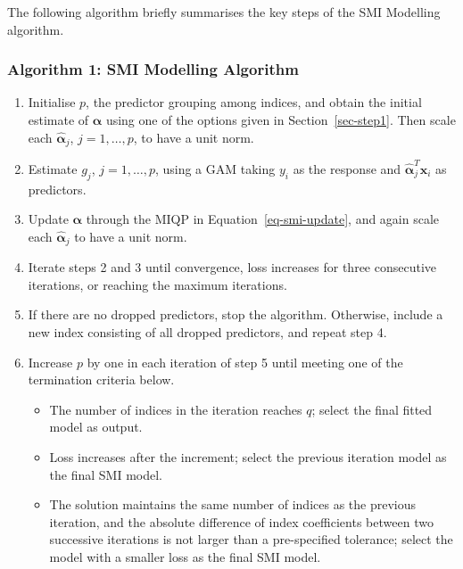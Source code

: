\documentclass[
  11pt,
  a4paper,
]{report}
\providecommand{\tightlist}{%
  \setlength{\itemsep}{0pt}\setlength{\parskip}{0pt}}\usepackage{longtable,booktabs,array}
\begin{document}
The following algorithm briefly summarises the key steps of the SMI
Modelling algorithm. \newline

\subsubsection*{Algorithm 1: SMI Modelling
Algorithm}\label{algorithm-1-smi-modelling-algorithm}

\begin{enumerate}
\def\labelenumi{\arabic{enumi}.}
\tightlist
\item
  Initialise \(p\), the predictor grouping among indices, and obtain the
  initial estimate of \(\bm{\alpha}\) using one of the options given in
  Section~\ref{sec-step1}. Then scale each \(\hat{\bm{\alpha}}_{j}\),
  \(j=1,\dots,p\), to have a unit norm.
\item
  Estimate \(g_{j}\), \(j=1,\dots,p\), using a GAM taking \(y_{i}\) as
  the response and \(\hat{\bm{\alpha}}_{j}^{T}\bm{x}_{i}\) as
  predictors.
\item
  Update \(\bm{\alpha}\) through the MIQP in
  Equation~\ref{eq-smi-update}, and again scale each
  \(\hat{\bm{\alpha}}_{j}\) to have a unit norm.
\item
  Iterate steps 2 and 3 until convergence, loss increases for three
  consecutive iterations, or reaching the maximum iterations.
\item
  If there are no dropped predictors, stop the algorithm. Otherwise,
  include a new index consisting of all dropped predictors, and repeat
  step 4.
\item
  Increase \(p\) by one in each iteration of step 5 until meeting one of
  the termination criteria below.

  \begin{itemize}
  \tightlist
  \item
    The number of indices in the iteration reaches \(q\); select the
    final fitted model as output.
  \item
    Loss increases after the increment; select the previous iteration
    model as the final SMI model.
  \item
    The solution maintains the same number of indices as the previous
    iteration, and the absolute difference of index coefficients between
    two successive iterations is not larger than a pre-specified
    tolerance; select the model with a smaller loss as the final SMI
    model.
  \end{itemize}
\end{enumerate}
\end{document}
